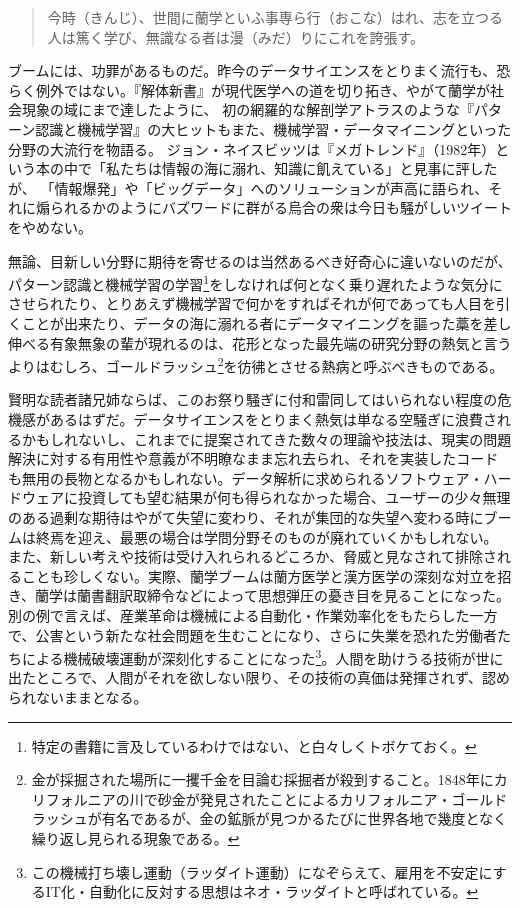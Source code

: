 \begin{quote}
今時（きんじ）、世間に蘭学といふ事専ら行（おこな）はれ、志を立つる人は篤く学び、無識なる者は漫（みだ）りにこれを誇張す。
\end{quote}

ブームには、功罪があるものだ。昨今のデータサイエンスをとりまく流行も、恐らく例外ではない。『解体新書』が現代医学への道を切り拓き、やがて蘭学が社会現象の域にまで達したように、
初の網羅的な解剖学アトラスのような『パターン認識と機械学習』の大ヒットもまた、機械学習・データマイニングといった分野の大流行を物語る。
ジョン・ネイスビッツは『メガトレンド』（1982年）という本の中で「私たちは情報の海に溺れ、知識に飢えている」と見事に評したが、
「情報爆発」や「ビッグデータ」へのソリューションが声高に語られ、それに煽られるかのようにバズワードに群がる烏合の衆は今日も騒がしいツイートをやめない。

無論、目新しい分野に期待を寄せるのは当然あるべき好奇心に違いないのだが、
パターン認識と機械学習の学習\footnote{特定の書籍に言及しているわけではない、と白々しくトボケておく。}をしなければ何となく乗り遅れたような気分にさせられたり、とりあえず機械学習で何かをすればそれが何であっても人目を引くことが出来たり、データの海に溺れる者にデータマイニングを謳った藁を差し伸べる有象無象の輩が現れるのは、花形となった最先端の研究分野の熱気と言うよりはむしろ、ゴールドラッシュ\footnote{金が採掘された場所に一攫千金を目論む採掘者が殺到すること。1848年にカリフォルニアの川で砂金が発見されたことによるカリフォルニア・ゴールドラッシュが有名であるが、金の鉱脈が見つかるたびに世界各地で幾度となく繰り返し見られる現象である。}を彷彿とさせる熱病と呼ぶべきものである。

賢明な読者諸兄姉ならば、このお祭り騒ぎに付和雷同してはいられない程度の危機感があるはずだ。データサイエンスをとりまく熱気は単なる空騒ぎに浪費されるかもしれないし、これまでに提案されてきた数々の理論や技法は、現実の問題解決に対する有用性や意義が不明瞭なまま忘れ去られ、それを実装したコードも無用の長物となるかもしれない。データ解析に求められるソフトウェア・ハードウェアに投資しても望む結果が何も得られなかった場合、ユーザーの少々無理のある過剰な期待はやがて失望に変わり、それが集団的な失望へ変わる時にブームは終焉を迎え、最悪の場合は学問分野そのものが廃れていくかもしれない。
また、新しい考えや技術は受け入れられるどころか、脅威と見なされて排除されることも珍しくない。実際、蘭学ブームは蘭方医学と漢方医学の深刻な対立を招き、蘭学は蘭書翻訳取締令などによって思想弾圧の憂き目を見ることになった。別の例で言えば、産業革命は機械による自動化・作業効率化をもたらした一方で、公害という新たな社会問題を生むことになり、さらに失業を恐れた労働者たちによる機械破壊運動が深刻化することになった\footnote{この機械打ち壊し運動（ラッダイト運動）になぞらえて、雇用を不安定にするIT化・自動化に反対する思想はネオ・ラッダイトと呼ばれている。}。人間を助けうる技術が世に出たところで、人間がそれを欲しない限り、その技術の真価は発揮されず、認められないままとなる。

